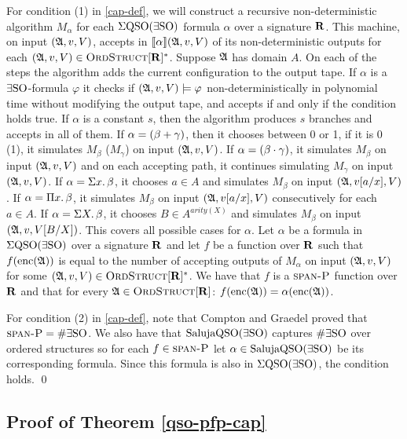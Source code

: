 For condition (1) in \ref{cap-def}, we will construct a recursive non-deterministic algorithm $M_{\alpha}$ for each $\Sigma{\rm QSO}(\exists{\rm SO})$ formula $\alpha$ over a signature $\mathbf{R}$. This machine, on input $(\mathfrak{A},v,V)$, accepts in ${\llbracket{}{\alpha}\rrbracket}(\mathfrak{A},v,V)$ of its non-deterministic outputs for each $(\mathfrak{A},v,V) \in \text{\sc OrdStruct}[\mathbf{R}]^*$. Suppose $\mathfrak{A}$ has domain $A$. On each of the steps the algorithm adds the current configuration to the output tape. If $\alpha$ is a $\exists{\rm SO}$-formula $\varphi$ it checks if $(\mathfrak{A},v,V)\models\varphi$ non-deterministically in polynomial time without modifying the output tape, and accepts if and only if the condition holds true. If $\alpha$ is a constant $s$, then the algorithm produces $s$ branches and accepts in all of them. If $\alpha = (\beta + \gamma)$, then it chooses between 0 or 1, if it is 0 (1), it simulates $M_{\beta}$ ($M_{\gamma}$) on input $(\mathfrak{A},v,V)$. If $\alpha = (\beta \cdot \gamma)$, it simulates $M_{\beta}$ on input $(\mathfrak{A},v,V)$ and on each accepting path, it continues simulating $M_{\gamma}$ on input $(\mathfrak{A},v,V)$. If $\alpha = \Sigma{x}.\,\beta$, it chooses $a\in A$ and simulates $M_{\beta}$ on input $(\mathfrak{A},v[a/x],V)$. If $\alpha = \Pi{x}.\,\beta$, it simulates $M_{\beta}$ on input $(\mathfrak{A},v[a/x],V)$ consecutively for each $a\in A$. If $\alpha = \Sigma{X}.\,\beta$, it chooses $B\in A^{arity(X)}$ and simulates $M_{\beta}$ on input $(\mathfrak{A},v,V[B/X])$. This covers all possible cases for $\alpha$. Let $\alpha$ be a formula in $\Sigma{\rm QSO}(\exists{\rm SO})$ over a signature $\mathbf{R}$ and let $f$ be a function over $\mathbf{R}$ such that $f({\rm enc}(\mathfrak{A}))$ is equal to the number of accepting outputs of $M_{\alpha}$ on input $(\mathfrak{A},v,V)$ for some $(\mathfrak{A},v,V) \in \text{\sc OrdStruct}[\mathbf{R}]^*$. We have that $f$ is a $\text{\sc span-P}$ function over $\mathbf{R}$ and that for every $\mathfrak{A}\in\text{\sc OrdStruct}[\mathbf{R}]$: $f({\rm enc}(\mathfrak{A})) = \alpha({\rm enc}(\mathfrak{A}))$.

For condition (2) in \ref{cap-def}, note that Compton and Graedel \cite{DBLP:journals/jcss/ComptonG96} proved that $\text{\sc span-P} = \#\exists{\rm SO}$. We also have that $\text{\rm Saluja}{\rm QSO}(\exists{\rm SO})$ captures $\#\exists{\rm SO}$ over ordered structures so for each $f\in \text{\sc span-P}$ let $\alpha \in \text{\rm Saluja}{\rm QSO}(\exists{\rm SO})$ be its corresponding formula. Since this formula is also in $\Sigma{\rm QSO}(\exists{\rm SO})$, the condition holds. \qed

\subsection{Proof of Theorem \ref{qso-pfp-cap}}

